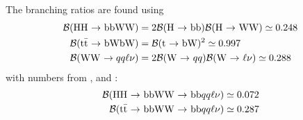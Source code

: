 \documentclass[10pt,a4paper]{article}
\renewcommand{\tt}{\ensuremath{\text{t}\bar{\text{t}}}}
\newcommand{\lnu}{\ensuremath{\ell\nu}}
\begin{document}
The branching ratios are found using
\begin{align*}
    \mathcal{B}(\text{HH $\rightarrow$ bbWW})
        &= 2\mathcal{B}(\text{H $\rightarrow$ bb})
            \mathcal{B}(\text{H $\rightarrow$ WW})
        \simeq 0.248 \\
    \mathcal{B}(\text{\tt\ $\rightarrow$ bWbW})
        &= \mathcal{B}(\text{t $\rightarrow$ bW})^2
        \simeq 0.997 \\
    \mathcal{B}(\text{WW $\rightarrow qq$\lnu})
        &= 2\mathcal{B}(\text{W $\rightarrow$ $qq$})
            \mathcal{B}(\text{W $\rightarrow$ \lnu})
        \simeq 0.288
\end{align*}
with numbers from \cite{BR_HH}, \cite{BR_tt} and \cite{BR_W}:
\begin{align*}
    \mathcal{B}(\text{HH $\rightarrow$ bbWW $\rightarrow$ bb$qq$\lnu})
         &\simeq 0.072\\
    \mathcal{B}(\text{\tt\ $\rightarrow$ bbWW $\rightarrow$ bb$qq$\lnu})
         &\simeq 0.287
\end{align*}
\end{document}

